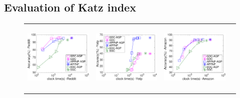 

\subsection{Evaluation of Katz index}

\begin{figure}[t]
		\centering
		\vspace{-1mm}
		\begin{tabular}{cccc}
			\hspace{-4mm} \includegraphics[height=34mm]{./Figs/GNN-accuracy-clock-Reddit.eps} &
			\hspace{-2mm} \includegraphics[height=34mm]{./Figs/GNN-accuracy-clock-Yelp.eps} &
			\hspace{-4mm} \includegraphics[height=34mm]{./Figs/GNN-accuracy-clock-Amazon.eps} &

\end{tabular}
\end{figure}
